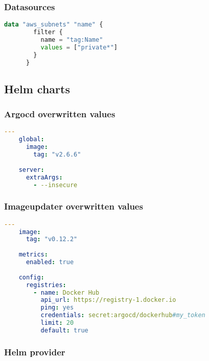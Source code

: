 \subsubsection{
{Datasources}}

\begin{lstlisting}[language=terraform]
    data "aws_subnets" "name" {
        filter {
          name = "tag:Name"
          values = ["private*"]
        }
      }
\end{lstlisting}

\subsection{
{Helm charts}}
\label{sec:Helm charts}

\subsubsection{
{Argocd overwritten values}}

\begin{lstlisting}[language=yaml, style=yamlstyle]
    ---
    global:
      image:
        tag: "v2.6.6"
    
    server:
      extraArgs:
        - --insecure
\end{lstlisting}

\subsubsection{
{Imageupdater overwritten values}}

\begin{lstlisting}[language=yaml, style=yamlstyle]
    ---
    image:
      tag: "v0.12.2"
    
    metrics:
      enabled: true
    
    config:
      registries:
        - name: Docker Hub
          api_url: https://registry-1.docker.io
          ping: yes
          credentials: secret:argocd/dockerhub#my_token
          limit: 20
          default: true    
\end{lstlisting}

\subsubsection{
{Helm provider}}
\label{sec:Helm provider}

